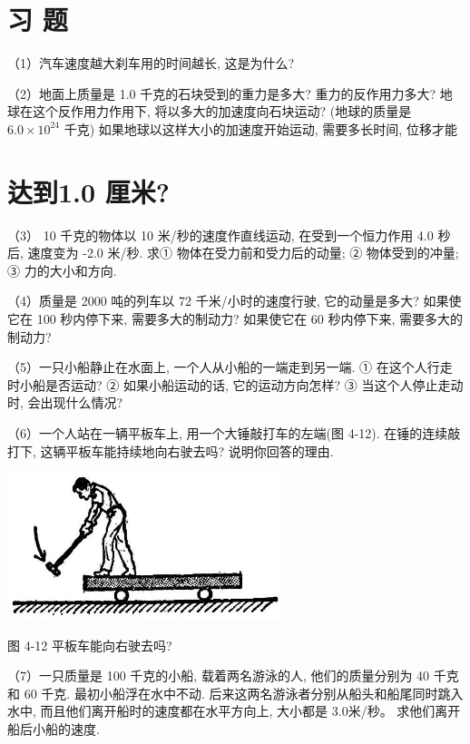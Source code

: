 \documentclass[10pt]{article}
\begin{document}
\section*{习 题}

（1）汽车速度越大刹车用的时间越长, 这是为什么?

（2）地面上质量是 1.0 千克的石块受到的重力是多大? 重力的反作用力多大? 地球在这个反作用力作用下, 将以多大的加速度向石块运动? (地球的质量是 \({6.0} \times {10}^{24}\) 千克) 如果地球以这样大小的加速度开始运动, 需要多长时间, 位移才能

\section*{达到1.0 厘米?}

（3） 10 千克的物体以 10 米/秒的速度作直线运动, 在受到一个恒力作用 4.0 秒后, 速度变为 -2.0 米/秒. 求① 物体在受力前和受力后的动量; ② 物体受到的冲量; ③ 力的大小和方向.

（4）质量是 2000 吨的列车以 72 千米/小时的速度行驶, 它的动量是多大? 如果使它在 100 秒内停下来, 需要多大的制动力? 如果使它在 60 秒内停下来, 需要多大的制动力?

（5）一只小船静止在水面上, 一个人从小船的一端走到另一端. ① 在这个人行走时小船是否运动? ② 如果小船运动的话, 它的运动方向怎样? ③ 当这个人停止走动时, 会出现什么情况?

（6）一个人站在一辆平板车上, 用一个大锤敲打车的左端(图 4-12). 在锤的连续敲打下, 这辆平板车能持续地向右驶去吗? 说明你回答的理由.

\begin{center}
\includegraphics[max width=0.6\textwidth]{images/01912d55-147c-70aa-b0e0-1782a122f948_128_543176.jpg}
\end{center}

图 4-12 平板车能向右驶去吗?

（7）一只质量是 100 千克的小船, 载着两名游泳的人, 他们的质量分别为 40 千克和 60 千克. 最初小船浮在水中不动. 后来这两名游泳者分别从船头和船尾同时跳入水中, 而且他们离开船时的速度都在水平方向上, 大小都是 3.0米/秒。 求他们离开船后小船的速度.
\end{document}
